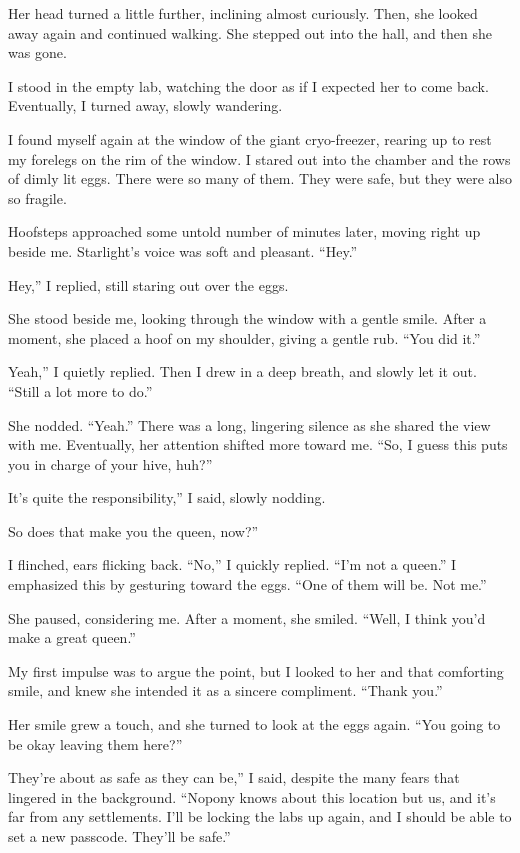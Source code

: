 Her head turned a little further, inclining almost curiously. Then, she looked away again and continued walking. She stepped out into the hall, and then she was gone.

I stood in the empty lab, watching the door as if I expected her to come back. Eventually, I turned away, slowly wandering.

I found myself again at the window of the giant cryo-freezer, rearing up to rest my forelegs on the rim of the window. I stared out into the chamber and the rows of dimly lit eggs. There were so many of them. They were safe, but they were also so fragile.

Hoofsteps approached some untold number of minutes later, moving right up beside me. Starlight’s voice was soft and pleasant. “Hey.”

\leavevmode{}Hey,” I replied, still staring out over the eggs.

She stood beside me, looking through the window with a gentle smile. After a moment, she placed a hoof on my shoulder, giving a gentle rub. “You did it.”

\leavevmode{}Yeah,” I quietly replied. Then I drew in a deep breath, and slowly let it out. “Still a lot more to do.”

She nodded. “Yeah.” There was a long, lingering silence as she shared the view with me. Eventually, her attention shifted more toward me. “So, I guess this puts you in charge of your hive, huh?”

\leavevmode{}It’s quite the responsibility,” I said, slowly nodding.

\leavevmode{}So does that make you the queen, now?”

I flinched, ears flicking back. “No,” I quickly replied. “I’m not a queen.” I emphasized this by gesturing toward the eggs. “One of them will be. Not me.”

She paused, considering me. After a moment, she smiled. “Well, I think you’d make a great queen.”

My first impulse was to argue the point, but I looked to her and that comforting smile, and knew she intended it as a sincere compliment. “Thank you.”

Her smile grew a touch, and she turned to look at the eggs again. “You going to be okay leaving them here?”

\leavevmode{}They’re about as safe as they can be,” I said, despite the many fears that lingered in the background. “Nopony knows about this location but us, and it’s far from any settlements. I’ll be locking the labs up again, and I should be able to set a new passcode. They’ll be safe.”

